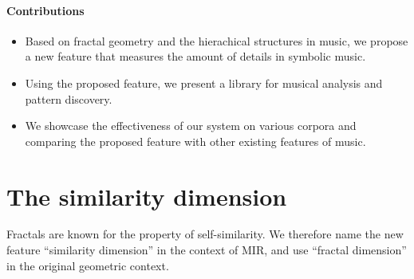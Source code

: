 \documentclass[acmsmall,10pt]{acmart}%
\begin{document}



\paragraph{Contributions}
\begin{itemize}
\item  Based on fractal geometry and the hierachical structures in music, we propose a
new feature that measures the amount of details in symbolic music.
\item  Using the proposed feature, we present a library for musical analysis and
  pattern discovery.
\item  We showcase the effectiveness of our system on various
corpora and comparing the proposed feature with other existing features of music. 
\end{itemize}

\section{The similarity dimension}
Fractals are known for the property of self-similarity. We therefore name the
new feature ``similarity dimension'' in the context of MIR, and use ``fractal
dimension'' in the original geometric context.
\end{document}
